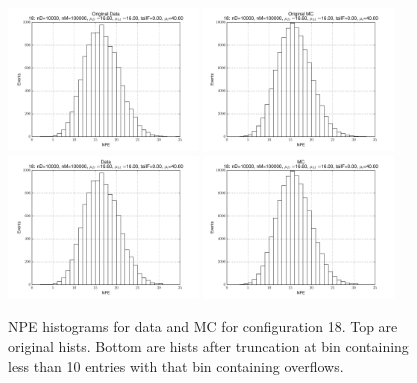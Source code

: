  \begin{figure}[htbp] \begin{center} 
\includegraphics[width=0.45\textwidth]{../FIGURES/18/FIG_Original_Data.pdf} 
\includegraphics[width=0.45\textwidth]{../FIGURES/18/FIG_Original_MC.pdf} 
\includegraphics[width=0.45\textwidth]{../FIGURES/18/FIG_Data.pdf} 
\includegraphics[width=0.45\textwidth]{../FIGURES/18/FIG_MC.pdf} 
\caption{NPE histograms for data and MC for configuration 18. Top are original hists. Bottom are hists after truncation at bin containing less than 10 entries with that bin containing overflows.} 
\label{tab:npe_18} 
\end{center} \end{figure} 

 